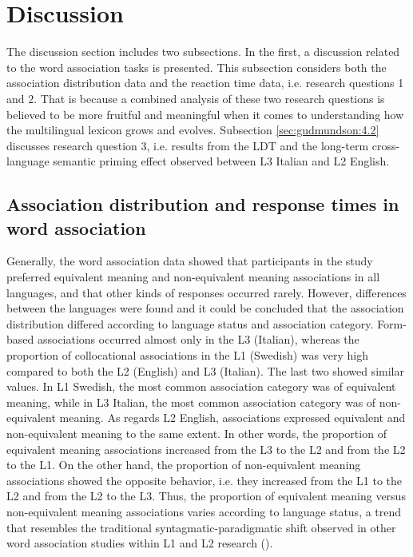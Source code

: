 \documentclass[output=paper,colorlinks,citecolor=brown,nonflat]{langsci/langscibook}
\begin{document}
\section{Discussion}\label{sec:gudmundson:4}

The discussion section includes two subsections. In the first, a discussion related to the word association tasks is presented. This subsection considers both the association distribution data and the reaction time data, i.e. research questions 1 and 2. That is because a combined analysis of these two research questions is believed to be more fruitful and meaningful when it comes to understanding how the multilingual lexicon grows and evolves. Subsection \ref{sec:gudmundson:4.2} discusses research question 3, i.e. results from the LDT and the long-term cross-language semantic priming effect observed between L3 Italian and L2 English.

\subsection{Association distribution and response times in word association}\label{sec:gudmundson:4.1}

Generally, the word association data showed that participants in the study preferred equivalent meaning and non-equivalent meaning associations in all languages, and that other kinds of responses occurred rarely. However, differences between the languages were found and it could be concluded that the association distribution differed according to language status and association category. Form-based associations occurred almost only in the L3 (Italian), whereas the proportion of collocational associations in the L1 (Swedish) was very high compared to both the L2 (English) and L3 (Italian). The last two showed similar values. In L1 Swedish, the most common association category was of equivalent meaning, while in L3 Italian, the most common association category was of non-equivalent meaning. As regards L2 English, associations expressed equivalent and non-equivalent meaning to the same extent. In other words, the proportion of equivalent meaning associations increased from the L3 to the L2 and from the L2 to the L1. On the other hand, the proportion of non-equivalent meaning associations showed the opposite behavior, i.e. they increased from the L1 to the L2 and from the L2 to the L3. Thus, the proportion of equivalent meaning versus non-equivalent meaning associations varies according to language status, a trend that resembles the traditional syntagmatic-paradigmatic shift observed in other word association studies within L1 and L2 research (\citealt{Ervin1961, EntwisleEtAl1964, Meara1978, Politzer1978, FitzpatrickIzura2011, KhazaeenezhadAlibabaee2013}).
\end{document}
